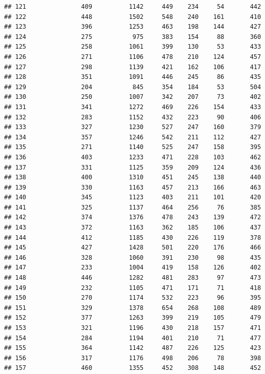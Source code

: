 \documentclass[]{book}
\begin{document}
\begin{verbatim}
## 121               409          1142     449    234     54       442
## 122               448          1502     548    240    161       410
## 123               396          1253     463    198    144       427
## 124               275           975     383    154     88       360
## 125               258          1061     399    130     53       433
## 126               271          1106     478    210    124       457
## 127               298          1139     421    162    106       417
## 128               351          1091     446    245     86       435
## 129               204           845     354    184     53       504
## 130               250          1007     342    207     73       402
## 131               341          1272     469    226    154       433
## 132               283          1152     432    223     90       406
## 133               327          1230     527    247    160       379
## 134               357          1246     542    211    112       427
## 135               271          1140     525    247    158       395
## 136               403          1233     471    228    103       462
## 137               331          1125     359    209    124       436
## 138               400          1310     451    245    138       440
## 139               330          1163     457    213    166       463
## 140               345          1123     403    211    101       420
## 141               325          1137     464    256     76       385
## 142               374          1376     478    243    139       472
## 143               372          1163     362    185    106       437
## 144               412          1185     430    226    119       378
## 145               427          1428     501    220    176       466
## 146               328          1060     391    230     98       435
## 147               233          1004     419    158    126       402
## 148               446          1282     481    283     97       473
## 149               232          1105     471    171     71       418
## 150               270          1174     532    223     96       395
## 151               329          1378     654    268    108       489
## 152               377          1263     399    219    105       479
## 153               321          1196     430    218    157       471
## 154               284          1194     401    210     71       477
## 155               364          1142     487    226    125       423
## 156               317          1176     498    206     78       398
## 157               460          1355     452    308    148       452

\end{verbatim}
\end{document}
